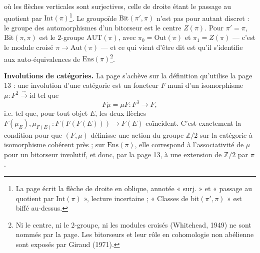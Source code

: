 \documentclass[11pt,a4paper]{article}
\begin{document}

où les flèches verticales sont surjectives, celle de droite étant le passage au
quotient par $\mathrm{Int}(\pi)$\footnote{La page écrit la flèche de droite en
oblique, annotée « surj. » et « passage au quotient par $\mathrm{Int}(\pi)$ »,
lecture incertaine ; « Classes de bit$(\pi', \pi)$ » est biffé au-dessus.}. Le
groupoïde $\mathrm{Bit}(\pi', \pi)$ n'est pas pour autant discret : le groupe des
automorphismes d'un bitorseur est le centre $Z(\pi)$. Pour $\pi' = \pi$,
$\mathrm{Bit}(\pi, \pi)$ est le $2$-groupe $\mathrm{AUT}(\pi)$, avec
$\pi_0 = \mathrm{Out}(\pi)$ et $\pi_1 = Z(\pi)$ — c'est le module croisé
$\pi \to \mathrm{Aut}(\pi)$ — et ce qui vient d'être dit est qu'il s'identifie aux
auto-équivalences de $\mathrm{Ens}(\pi)$\footnote{Ni le centre, ni le $2$-groupe, ni
les modules croisés (Whitehead, 1949) ne sont nommés par la page. Les
bitorseurs et leur rôle en cohomologie non abélienne sont exposés par Giraud
(1971).}.

\textbf{Involutions de catégories.} La page s'achève sur la définition qu'utilise
la page 13 : une involution d'une catégorie est un foncteur $F$ muni d'un
isomorphisme $\mu : F^2 \xrightarrow{\sim} \mathrm{id}$ tel que
\[
F\mu = \mu F : F^3 \longrightarrow F,
\]
i.e. tel que, pour tout objet $E$, les deux flèches
$F(\mu_E), \mu_{F(E)} : F(F(F(E))) \to F(E)$ coïncident. C'est exactement la condition
pour que $(F, \mu)$ définisse une action du groupe $\mathbb{Z}/2$ sur la catégorie à
isomorphisme cohérent près ; sur $\mathrm{Ens}(\pi)$, elle correspond à
l'associativité de $\mu$ pour un bitorseur involutif, et donc, par la page 13,
à une extension de $\mathbb{Z}/2$ par $\pi$.
\end{document}
